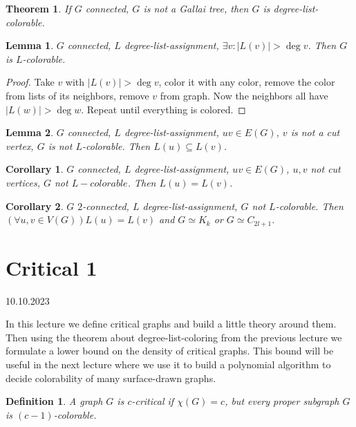 \documentclass{article}
\newtheorem*{theorem}{Theorem}
\newtheorem*{definition}{Definition}
\newtheorem*{lemma}{Lemma}
\newtheorem*{corollary}{Corollary}
\begin{document}
\begin{theorem}
	If $G$ connected, $G$ is not a Gallai tree, then $G$ is
	degree-list-colorable.
\end{theorem}

\begin{lemma}
	$G$ connected, $L$ degree-list-assignment, $\exists v: |L(v)| > \deg
	v$. Then $G$ is $L$-colorable.
\end{lemma}
\begin{proof}
	Take $v$ with $|L(v)| > \deg v$, color it with any color, remove the
	color from lists of its neighbors, remove $v$ from graph. Now the
	neighbors all have $|L(w)| > \deg w$. Repeat until everything is
	colored.
\end{proof}

\begin{lemma}
	$G$ connected, $L$ degree-list-assignment, $uv \in E(G)$, $v$ is not a
	cut vertex, $G$ is not $L$-colorable. Then $L(u) \subseteq L(v)$.
\end{lemma}

\begin{corollary}
	$G$ connected, $L$ degree-list-assignment, $uv \in E(G)$, $u, v$ not
	cut vertices, $G$ not $L-colorable$. Then $L(u) = L(v)$.
\end{corollary}

\begin{corollary}
	$G$ $2$-connected, $L$ degree-list-assignment, $G$ not $L$-colorable.
	Then $(\forall u, v \in V(G)) L(u) = L(v)$ and $G \simeq K_k$ or $G
	\simeq C_{2l+1}$.
\end{corollary}


\newpage
\section{Critical 1} %
10.10.2023

\noindent
In this lecture we define critical graphs and build a little theory around
them. Then using the theorem about degree-list-coloring from the previous
lecture we formulate a lower bound on the density of critical graphs. This
bound will be useful in the next lecture where we use it to build a polynomial
algorithm to decide colorability of many surface-drawn graphs.

\begin{definition}
	A graph $G$ is \emph{$c$-critical} if $\chi(G) = c$, but every proper
	subgraph $G$ is $(c - 1)$-colorable.
\end{definition}
\end{document}
